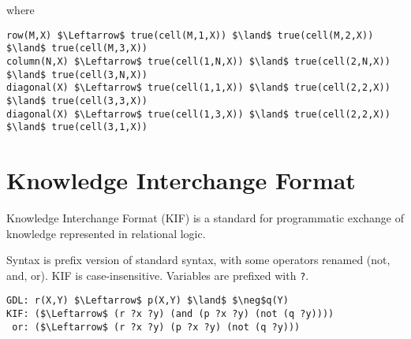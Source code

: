 where
\begin{lstlisting}[morekeywords={true}]
row(M,X) $\Leftarrow$ true(cell(M,1,X)) $\land$ true(cell(M,2,X)) $\land$ true(cell(M,3,X))
column(N,X) $\Leftarrow$ true(cell(1,N,X)) $\land$ true(cell(2,N,X)) $\land$ true(cell(3,N,X))
diagonal(X) $\Leftarrow$ true(cell(1,1,X)) $\land$ true(cell(2,2,X)) $\land$ true(cell(3,3,X))
diagonal(X) $\Leftarrow$ true(cell(1,3,X)) $\land$ true(cell(2,2,X)) $\land$ true(cell(3,1,X))
\end{lstlisting}

\section{Knowledge Interchange Format}
Knowledge Interchange Format (KIF) is a standard for programmatic exchange of
knowledge represented in relational logic.

Syntax is prefix version of standard syntax, with some operators renamed (not,
and, or). KIF is case-insensitive. Variables are prefixed with \verb|?|.

\begin{lstlisting}
GDL: r(X,Y) $\Leftarrow$ p(X,Y) $\land$ $\neg$q(Y)
KIF: ($\Leftarrow$ (r ?x ?y) (and (p ?x ?y) (not (q ?y))))
 or: ($\Leftarrow$ (r ?x ?y) (p ?x ?y) (not (q ?y)))
\end{lstlisting}

